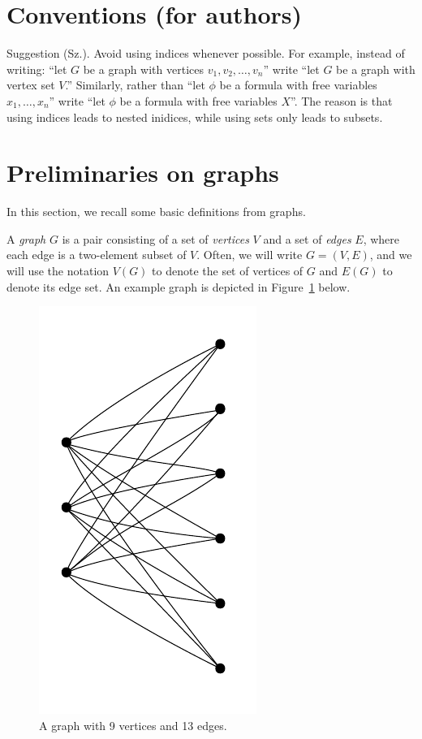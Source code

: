 \section*{Conventions (for authors)}
Suggestion (Sz.).
Avoid using indices whenever possible.
For example, instead of writing:
``let $G$ be a graph with vertices $v_1,v_2,\ldots,v_n$''
write
``let $G$ be a graph with vertex set $V$.''
Similarly, rather than 
``let $\phi$ be a formula with free variables $x_1,\ldots,x_n$''
write ``let $\phi$ be a formula with free variables $X$''.
The reason is that using indices leads to nested inidices, while using sets only leads to subsets.



\section{Preliminaries on graphs}
In this section, we recall some basic definitions from graphs.

A \emph{graph} $G$ is a pair consisting of a set of 
\emph{vertices} $V$ and a set of \emph{edges} $E$, where each edge is a two-element subset of $V$.
Often, we will write $G=(V,E)$,
and we will use the notation $V(G)$ to denote the set of vertices of $G$
and $E(G)$ to denote its edge set. An example graph is depicted in Figure~\ref{fig:graph} below. 


\begin{figure}[h]
  \centering
	    \includegraphics[scale=0.35,page=8]{pictures.pdf}
  \caption{A graph with 9 vertices and 13 edges.}
  \label{fig:graph}
\end{figure}


